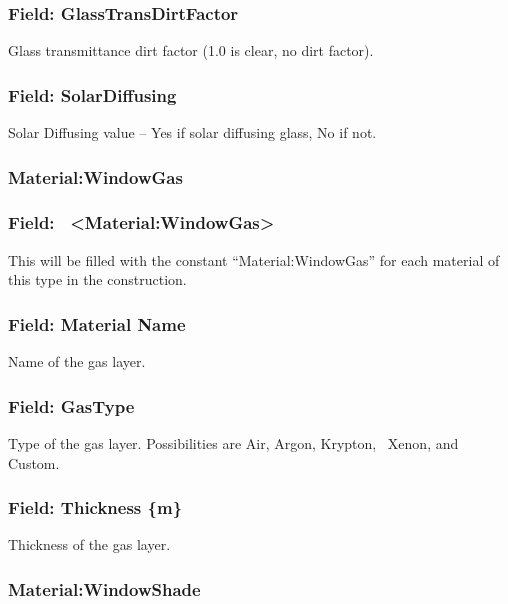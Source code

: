 \subsubsection{Field: GlassTransDirtFactor}\label{field-glasstransdirtfactor}

Glass transmittance dirt factor (1.0 is clear, no dirt factor).

\subsubsection{Field: SolarDiffusing}\label{field-solardiffusing}

Solar Diffusing value -- Yes if solar diffusing glass, No if not.

\subsubsection{Material:WindowGas}\label{materialwindowgas}

\subsubsection{Field:~ \textless{}Material:WindowGas\textgreater{}}\label{field-materialwindowgas}

This will be filled with the constant ``Material:WindowGas'' for each material of this type in the construction.

\subsubsection{Field: Material Name}\label{field-material-name-3}

Name of the gas layer.

\subsubsection{Field: GasType}\label{field-gastype}

Type of the gas layer. Possibilities are Air, Argon, Krypton,~ Xenon, and Custom.

\subsubsection{Field: Thickness \{m\}}\label{field-thickness-m-1}

Thickness of the gas layer.

\subsubsection{Material:WindowShade}\label{materialwindowshade}

